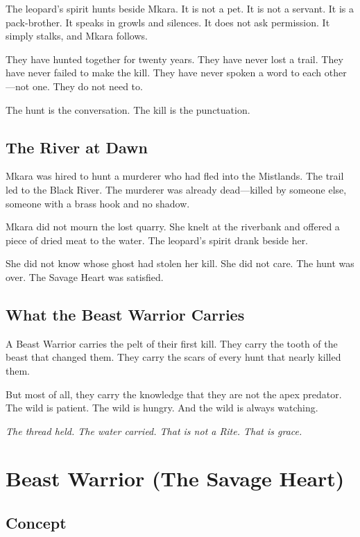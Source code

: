 The leopard's spirit hunts beside Mkara. It is not a pet. It is not a servant. It is a pack-brother. It speaks in growls and silences. It does not ask permission. It simply stalks, and Mkara follows.

They have hunted together for twenty years. They have never lost a trail. They have never failed to make the kill. They have never spoken a word to each other—not one. They do not need to.

The hunt is the conversation. The kill is the punctuation.

\subsection{The River at Dawn}

Mkara was hired to hunt a murderer who had fled into the Mistlands. The trail led to the Black River. The murderer was already dead—killed by someone else, someone with a brass hook and no shadow.

Mkara did not mourn the lost quarry. She knelt at the riverbank and offered a piece of dried meat to the water. The leopard's spirit drank beside her.

She did not know whose ghost had stolen her kill. She did not care. The hunt was over. The Savage Heart was satisfied.

\subsection{What the Beast Warrior Carries}

A Beast Warrior carries the pelt of their first kill. They carry the tooth of the beast that changed them. They carry the scars of every hunt that nearly killed them.

But most of all, they carry the knowledge that they are not the apex predator. The wild is patient. The wild is hungry. And the wild is always watching.

\vspace{1em}
\begin{center}
\textit{The thread held. The water carried. That is not a Rite. That is grace.}
\end{center}

\section{Beast Warrior (The Savage Heart)}

\subsection{Concept}

